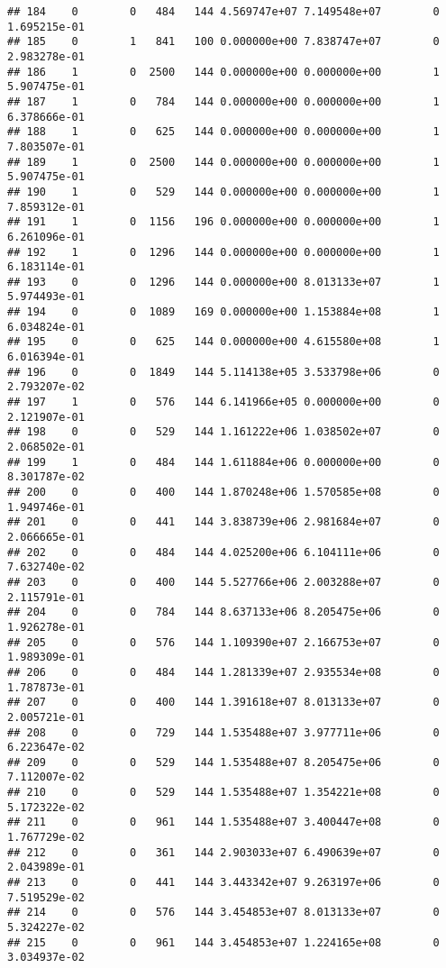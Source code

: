 \documentclass[
]{article}
\begin{document}
\begin{enumerate}
\begin{verbatim}
## 184    0        0   484   144 4.569747e+07 7.149548e+07        0  1.695215e-01
## 185    0        1   841   100 0.000000e+00 7.838747e+07        0  2.983278e-01
## 186    1        0  2500   144 0.000000e+00 0.000000e+00        1  5.907475e-01
## 187    1        0   784   144 0.000000e+00 0.000000e+00        1  6.378666e-01
## 188    1        0   625   144 0.000000e+00 0.000000e+00        1  7.803507e-01
## 189    1        0  2500   144 0.000000e+00 0.000000e+00        1  5.907475e-01
## 190    1        0   529   144 0.000000e+00 0.000000e+00        1  7.859312e-01
## 191    1        0  1156   196 0.000000e+00 0.000000e+00        1  6.261096e-01
## 192    1        0  1296   144 0.000000e+00 0.000000e+00        1  6.183114e-01
## 193    0        0  1296   144 0.000000e+00 8.013133e+07        1  5.974493e-01
## 194    0        0  1089   169 0.000000e+00 1.153884e+08        1  6.034824e-01
## 195    0        0   625   144 0.000000e+00 4.615580e+08        1  6.016394e-01
## 196    0        0  1849   144 5.114138e+05 3.533798e+06        0  2.793207e-02
## 197    1        0   576   144 6.141966e+05 0.000000e+00        0  2.121907e-01
## 198    0        0   529   144 1.161222e+06 1.038502e+07        0  2.068502e-01
## 199    1        0   484   144 1.611884e+06 0.000000e+00        0  8.301787e-02
## 200    0        0   400   144 1.870248e+06 1.570585e+08        0  1.949746e-01
## 201    0        0   441   144 3.838739e+06 2.981684e+07        0  2.066665e-01
## 202    0        0   484   144 4.025200e+06 6.104111e+06        0  7.632740e-02
## 203    0        0   400   144 5.527766e+06 2.003288e+07        0  2.115791e-01
## 204    0        0   784   144 8.637133e+06 8.205475e+06        0  1.926278e-01
## 205    0        0   576   144 1.109390e+07 2.166753e+07        0  1.989309e-01
## 206    0        0   484   144 1.281339e+07 2.935534e+08        0  1.787873e-01
## 207    0        0   400   144 1.391618e+07 8.013133e+07        0  2.005721e-01
## 208    0        0   729   144 1.535488e+07 3.977711e+06        0  6.223647e-02
## 209    0        0   529   144 1.535488e+07 8.205475e+06        0  7.112007e-02
## 210    0        0   529   144 1.535488e+07 1.354221e+08        0  5.172322e-02
## 211    0        0   961   144 1.535488e+07 3.400447e+08        0  1.767729e-02
## 212    0        0   361   144 2.903033e+07 6.490639e+07        0  2.043989e-01
## 213    0        0   441   144 3.443342e+07 9.263197e+06        0  7.519529e-02
## 214    0        0   576   144 3.454853e+07 8.013133e+07        0  5.324227e-02
## 215    0        0   961   144 3.454853e+07 1.224165e+08        0  3.034937e-02

\end{verbatim}
\end{enumerate}
\end{document}
